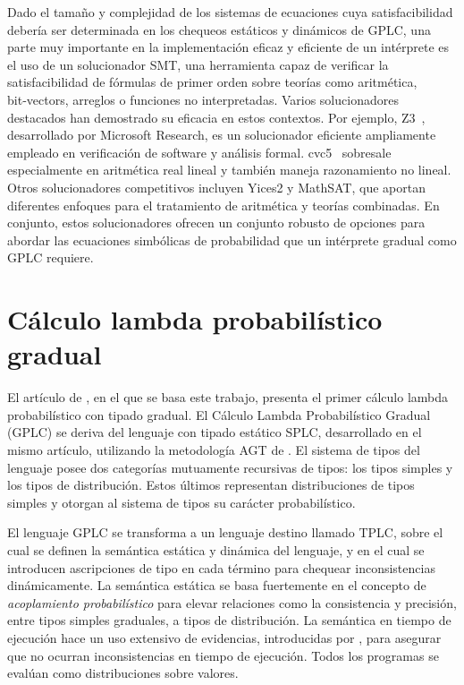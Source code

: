 Dado el tamaño y complejidad de los sistemas de ecuaciones cuya satisfacibilidad debería ser determinada en los chequeos estáticos y dinámicos de GPLC, una parte muy importante en la implementación eficaz y eficiente de un intérprete es el uso de un solucionador SMT, una herramienta capaz de verificar la satisfacibilidad de fórmulas de primer orden sobre teorías como aritmética, bit‑vectors, arreglos o funciones no interpretadas. Varios solucionadores destacados han demostrado su eficacia en estos contextos. Por ejemplo, Z3~\citep{MouraB08}, desarrollado por Microsoft Research, es un solucionador eficiente ampliamente empleado en verificación de software y análisis formal. cvc5~\citep{KremerReynoldsBarrettTinelli22} sobresale especialmente en aritmética real lineal y también maneja razonamiento no lineal. Otros solucionadores competitivos incluyen Yices2 y MathSAT, que aportan diferentes enfoques para el tratamiento de aritmética y teorías combinadas. En conjunto, estos solucionadores ofrecen un conjunto robusto de opciones para abordar las ecuaciones simbólicas de probabilidad que un intérprete gradual como GPLC requiere.

\section{Cálculo lambda probabilístico gradual}

El artículo de \citet{gplc}, en el que se basa este trabajo, presenta el primer cálculo lambda probabilístico con tipado gradual. El Cálculo Lambda Probabilístico Gradual (GPLC) se deriva del lenguaje con tipado estático SPLC, desarrollado en el mismo artículo, utilizando la metodología AGT de \citet{agt}. El sistema de tipos del lenguaje posee dos categorías mutuamente recursivas de tipos: los tipos simples y los tipos de distribución. Estos últimos representan distribuciones de tipos simples y otorgan al sistema de tipos su carácter probabilístico.

El lenguaje GPLC se transforma a un lenguaje destino llamado TPLC, sobre el cual se definen la semántica estática y dinámica del lenguaje, y en el cual se introducen ascripciones de tipo en cada término para chequear inconsistencias dinámicamente. La semántica estática se basa fuertemente en el concepto de \emph{acoplamiento probabilístico} para elevar relaciones como la consistencia y precisión, entre tipos simples graduales, a tipos de distribución. La semántica en tiempo de ejecución hace un uso extensivo de evidencias, introducidas por \citet{agt}, para asegurar que no ocurran inconsistencias en tiempo de ejecución. Todos los programas se evalúan como distribuciones sobre valores.

